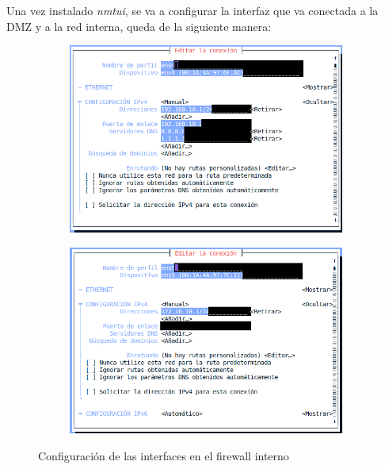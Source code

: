 \documentclass[11pt]{report}
\begin{document}
Una vez instalado \emph{nmtui}, se va a configurar la interfaz que va conectada a la DMZ y a la red interna, queda de la siguiente
manera:
\begin{figure}[H]
  \begin{subfigure}{0.5\textwidth}
    \centering
    \includegraphics[scale=0.42]{img/fw-interno_interface_to_DMZ.png}
  \end{subfigure}%
  \begin{subfigure}{0.5\textwidth}
    \centering
    \includegraphics[scale=0.42]{img/fw-interno_interface_to_LAN.png}
  \end{subfigure}
  \caption{Configuración de las interfaces en el firewall interno}
\end{figure}


\end{document}
